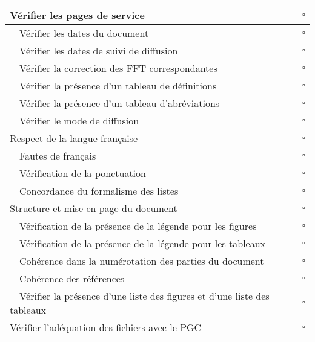 \begin{table}[H]
\centering
 \begin{tabular}{|l | c|}
 \hline
 \cellcolor{gray!40} Vérifier les pages de service & $\square$ \\
 \hline
  ~~Vérifier les dates du document & $\square$ \\
  ~~Vérifier les dates de suivi de diffusion & $\square$ \\
  ~~Vérifier la correction des FFT correspondantes & $\square$ \\
  ~~Vérifier la présence d'un tableau de définitions & $\square$ \\
  ~~Vérifier la présence d'un tableau d'abréviations & $\square$ \\
  ~~Vérifier le mode de diffusion & $\square$ \\
  \hline
 \cellcolor{gray!40} Respect de la langue française & $\square$ \\
 \hline
  ~~Fautes de français & $\square$ \\
  ~~Vérification de la ponctuation & $\square$ \\
  ~~Concordance du formalisme des listes & $\square$ \\
 \hline
 \cellcolor{gray!40} Structure et mise en page du document & $\square$ \\
 \hline
  ~~Vérification de la présence de la légende pour les figures & $\square$ \\
  ~~Vérification de la présence de la légende pour les tableaux & $\square$ \\
  ~~Cohérence dans la numérotation des parties du document & $\square$ \\
  ~~Cohérence des références & $\square$ \\
  ~~Vérifier la présence d'une liste des figures et d'une liste des tableaux & $\square$ \\
  \hline
  \cellcolor{gray!40} Vérifier l'adéquation des fichiers avec le PGC  & $\square$ \\
  \hline
 \end{tabular}
\end{table}